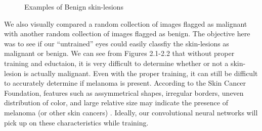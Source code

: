 \documentclass [MAS] {uclathes}
\begin{document}
\begin{figure}[hbt!]
\hspace*{\fill}
\centering
{}\hspace{0.5em}
\hspace{0.5em}
\hspace*{\fill}
\label{fig:ben_examples}
\vspace{-1cm}
\caption{Examples of Benign skin-lesions}
\end{figure}


We also visually compared a random collection of images flagged as malignant with another random collection of images flagged as benign. The objective here was to see if our ``untrained'' eyes could easily classfiy the skin-lesions as malignant or benign. We can see from Figures 2.1-2.2 that without proper training and eductaion, it is very difficult to determine whether or not a skin-lesion is actually malignant. Even with the proper training, it can still be difficult to accurately determine if melanoma is present. According to the Skin Cancer Foundation, features such as assymmetrical shapes, irregular borders, uneven distribution of color, and large relative size may indicate the presence of melanoma (or other skin cancers) \cite{SCF}. Ideally, our convolutional neural networks will pick up on these characteristics while training.
\end{document}
